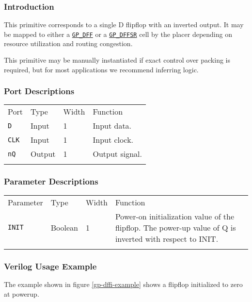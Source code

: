 \documentclass[11pt]{article}
\newcommand{\tokenstyle}[1]{\texttt{#1}}
\newcommand{\whenstyle}[1]{{\fontseries{sb}\selectfont#1}}
\newcommand{\tokenref}[2]{\hyperref[#2]{\tokenstyle{#1}}}
\newcommand{\thinhline}{\Xhline{1\arrayrulewidth}}
\newcommand{\thickhline}{\Xhline{2.5\arrayrulewidth}}
\begin{document}
\subsubsection{Introduction}
This primitive corresponds to a single D flipflop with an inverted output. It may be mapped to either a
\tokenref{GP\_DFF}{gp-dff} or a \tokenref{GP\_DFFSR}{gp-dffsr} cell by the placer depending on resource utilization and
routing congestion.

This primitive may be manually instantiated if exact control over packing is required, but for most applications we
recommend inferring logic.

\subsubsection{Port Descriptions}

\begin{tabularx}{\textwidth}{lllX}
\thinhline
\whenstyle{Port} & \whenstyle{Type} & \whenstyle{Width} & \whenstyle{Function} \\
\thickhline
\tokenstyle{D} & Input & 1 & Input data. \\
\thinhline
\tokenstyle{CLK} & Input & 1 & Input clock. \\
\thinhline
\tokenstyle{nQ} & Output & 1 & Output signal. \\
\thinhline
\end{tabularx}

\subsubsection{Parameter Descriptions}

\begin{tabularx}{\textwidth}{lllX}
\thinhline
\whenstyle{Parameter} & \whenstyle{Type} & \whenstyle{Width} & \whenstyle{Function} \\
\thickhline
\tokenstyle{INIT} & Boolean & 1 & Power-on initialization value of the flipflop. \newline The power-up value of Q is inverted
with respect to INIT.\\
\thinhline
\end{tabularx}

\subsubsection{Verilog Usage Example}

The example shown in figure \ref{gp-dffi-example} shows a flipflop initialized to zero at powerup.
\end{document}
